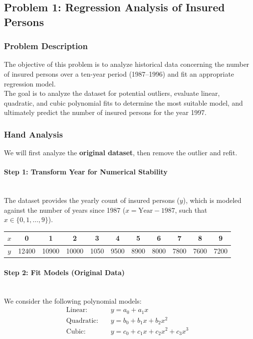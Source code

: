 \subsection{Problem 1: Regression Analysis of Insured Persons}
\subsubsection{Problem Description}
The objective of this problem is to analyze historical data concerning the number of insured persons over a ten-year period (1987–1996) and fit an appropriate regression model. \\
The goal is to analyze the dataset for potential outliers, evaluate linear, quadratic, and cubic polynomial fits to determine the most suitable model, and ultimately predict the number of insured persons for the year 1997. 

\subsubsection{Hand Analysis}
We will first analyze the \textbf{original dataset}, then remove the outlier and refit.

\paragraph{Step 1: Transform Year for Numerical Stability} \mbox{} \\
The dataset provides the yearly count of insured persons ($y$), which is modeled against the number of years since 1987 ($x = \text{Year} - 1987$, such that $x \in \{0, 1, \dots, 9\}$). 

\begin{table}[H]
\centering
\begin{tabular}{|c|cccccccccc|}
\hline
$x$ & 0 & 1 & 2 & 3 & 4 & 5 & 6 & 7 & 8 & 9 \\
\hline
$y$ & 12400 & 10900 & 10000 & 1050 & 9500 & 8900 & 8000 & 7800 & 7600 & 7200 \\
\hline
\end{tabular}
\end{table}

\paragraph{Step 2: Fit Models (Original Data)} \mbox{} \\
We consider the following polynomial models:
\begin{align*}
\text{Linear:} \quad & y = a_0 + a_1 x \\
\text{Quadratic:} \quad & y = b_0 + b_1 x + b_2 x^2 \\
\text{Cubic:} \quad & y = c_0 + c_1 x + c_2 x^2 + c_3 x^3
\end{align*}


